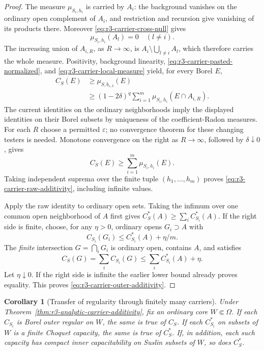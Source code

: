 \documentclass[11pt,a4paper]{article}
\numberwithin{equation}{section}
\newtheorem{corollary}[theorem]{Corollary}
\theoremstyle{definition}
\theoremstyle{remark}
\begin{document}
\begin{proof}
The measure $\mu_{S_i,h_i}$ is carried by $A_i$: the background
vanishes on the ordinary open complement of $A_i$, and restriction
and recursion give vanishing of its products there.  Moreover
\eqref{eq:r3-carrier-cross-null} gives
\[
 \mu_{S_i,h_i}(A_l)=0\quad(l\ne i).
\]
The increasing union of $A_{i,R}$, as $R\to\infty$, is
$A_i\setminus\bigcup_{l\ne i}A_l$, which therefore carries the
whole measure.  Positivity, background linearity,
\eqref{eq:r3-carrier-pasted-normalized}, and
\eqref{eq:r3-carrier-local-measure} yield, for every Borel $E$,
\[
 \begin{split}
 C_S(E)
 &\geq\mu_{S,b_{\varepsilon,\delta}}(E)\\
 &\geq(1-2\delta)^q
            \sum_{i=1}^m\mu_{S_i,h_i}(E\cap A_{i,R}).
 \end{split}
\]
The current identities on the ordinary neighborhoods imply the
displayed identities on their Borel subsets by uniqueness of the
coefficient-Radon measures.  For each $R$ choose a permitted
$\varepsilon$; no convergence theorem for these changing testers
is needed.  Monotone convergence on the right as $R\to\infty$,
followed by $\delta\downarrow0$, gives
\[
 C_S(E)\geq\sum_{i=1}^m\mu_{S_i,h_i}(E).
\]
Taking independent suprema over the finite tuple $(h_1,\ldots,h_m)$
proves \eqref{eq:r3-carrier-raw-additivity}, including infinite
values.

Apply the raw identity to ordinary open sets.  Taking the infimum
over one common open neighborhood of $A$ first gives
$C_S^*(A)\geq\sum_iC_{S_i}^*(A)$.  If the right side is finite,
choose, for any $\eta>0$, ordinary opens $G_i\supset A$ with
\[
 C_{S_i}(G_i)\leq C_{S_i}^*(A)+\eta/m.
\]
The \emph{finite} intersection $G=\bigcap_iG_i$ is ordinary open,
contains $A$, and satisfies
\[
 C_S(G)=\sum_iC_{S_i}(G)
       \leq\sum_iC_{S_i}^*(A)+\eta.
\]
Let $\eta\downarrow0$.  If the right side is infinite the earlier
lower bound already proves equality.  This proves
\eqref{eq:r3-carrier-outer-additivity}.
\end{proof}

\begin{corollary}[Transfer of regularity through finitely many carriers]
\label{cor:r3-carrier-regularity-transfer}
Under Theorem~\ref{thm:r3-analytic-carrier-additivity}, fix an ordinary
core $W\Subset\Omega$.  If each $C_{S_i}$ is Borel outer regular
on $W$, the same is true of $C_S$.  If each $C_{S_i}^*$ on subsets
of $W$ is a finite Choquet capacity, the same is true of $C_S^*$.
If, in addition, each such capacity has compact inner capacitability
on Suslin subsets of $W$, so does $C_S^*$.
\end{corollary}
\end{document}
